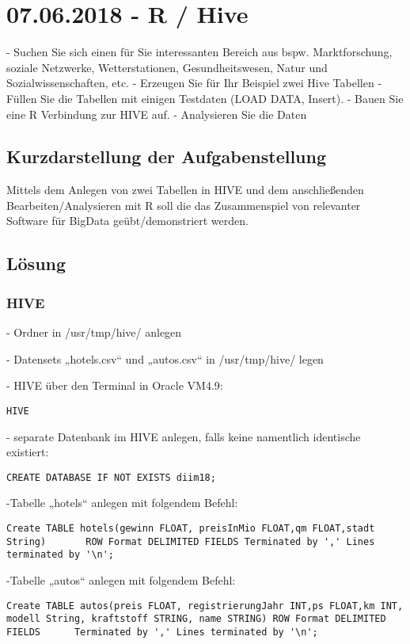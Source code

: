 \section{07.06.2018 - R / Hive}
- Suchen Sie sich einen für Sie interessanten Bereich aus bspw. Marktforschung, soziale Netzwerke, Wetterstationen, Gesundheitswesen, Natur und Sozialwissenschaften, etc.
- Erzeugen Sie für Ihr Beispiel zwei Hive Tabellen
- Füllen Sie die Tabellen mit einigen Testdaten (LOAD DATA, Insert).
- Bauen Sie eine R Verbindung zur HIVE auf.
- Analysieren Sie die Daten

\subsection{Kurzdarstellung der Aufgabenstellung}
Mittels dem Anlegen von zwei Tabellen in HIVE und dem anschließenden Bearbeiten/Analysieren mit R soll die das Zusammenspiel von relevanter Software für BigData geübt/demonstriert werden.
\subsection{Lösung}
\subsubsection*{HIVE}

- Ordner in /usr/tmp/hive/ anlegen

- Datensets „hotels.csv“ und „autos.csv“  in /usr/tmp/hive/ legen

- HIVE über den Terminal in Oracle VM4.9:
\begin{lstlisting}
HIVE
\end{lstlisting}

- separate Datenbank im HIVE anlegen, falls keine namentlich identische existiert:
\begin{lstlisting}
CREATE DATABASE IF NOT EXISTS diim18;
\end{lstlisting}

-Tabelle „hotels“ anlegen mit folgendem Befehl:
\begin{lstlisting}
Create TABLE hotels(gewinn FLOAT, preisInMio FLOAT,qm FLOAT,stadt String)       ROW Format DELIMITED FIELDS Terminated by ',' Lines terminated by '\n';
\end{lstlisting}

-Tabelle „autos“ anlegen mit folgendem Befehl:
\begin{lstlisting}
Create TABLE autos(preis FLOAT, registrierungJahr INT,ps FLOAT,km INT,  modell String, kraftstoff STRING, name STRING) ROW Format DELIMITED FIELDS      Terminated by ',' Lines terminated by '\n';
\end{lstlisting}

